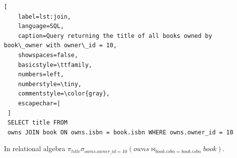 \begin{lstlisting}[
    label=lst:join,
    language=SQL,
    caption=Query returning the title of all books owned by book\_owner with owner\_id = 10,
    showspaces=false,
    basicstyle=\ttfamily,
    numbers=left,
    numberstyle=\tiny,
    commentstyle=\color{gray},
    escapechar=|
 ]
 SELECT title FROM
 owns JOIN book ON owns.isbn = book.isbn WHERE owns.owner_id = 10  
\end{lstlisting}

In relational algebra $\pi_{title}\sigma_{owns.owner\_id = 10}(owns \Join_{book.isbn = book.isbn} book )$.






